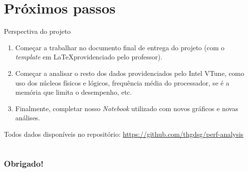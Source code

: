\documentclass{beamer}
\begin{document}
\section{Próximos passos}
\begin{frame}{Perspectiva do projeto}
 \begin{enumerate}
     \item Começar a trabalhar no documento final de entrega do projeto (com o \textit{template} em \LaTeX providenciado pelo professor).
     \item Começar a analisar o resto dos dados providenciados pelo Intel VTune, como uso dos núcleos físicos e lógicos, frequência média do processador, se é a memória que limita o desempenho, etc.
     \item Finalmente, completar nosso \textit{Notebook} utilizado com novos gráficos e novas análises.
 \end{enumerate}
 \tiny %
    Todos dados disponíveis no repositório: \url{https://github.com/thgdsg/perf-analysis}
\end{frame}

\section*{}
\begin{frame}
    \frametitle{Obrigado!}
    \InfContacts
\end{frame}
\end{document}
